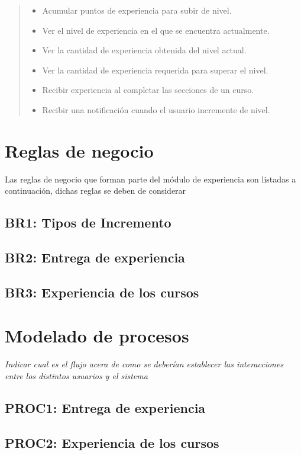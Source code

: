     \begin{quote}
    \begin{itemize}
        \item Acumular puntos de experiencia para subir de nivel.
        \item Ver el nivel de experiencia en el que se encuentra actualmente.
        \item Ver la cantidad de experiencia obtenida del nivel actual.
        \item Ver la cantidad de experiencia requerida para superar el nivel.
        \item Recibir experiencia al completar las secciones de un curso.
        \item Recibir una notificación cuando el usuario incremente de nivel.
    \end{itemize}
    \end{quote}

\section{Reglas de negocio}
Las reglas de negocio que forman parte del módulo de experiencia son listadas a continuación, dichas reglas se deben de considerar

\subsection{BR1: Tipos de Incremento}
\subsection{BR2: Entrega de experiencia}
\subsection{BR3: Experiencia de los cursos}

\section{Modelado de procesos}

{\it\color{gray} Indicar cual es el flujo acera de como se deberían establecer las interacciones entre los distintos usuarios y el sistema}

\subsection{PROC1: Entrega de experiencia}
\subsection{PROC2: Experiencia de los cursos}
